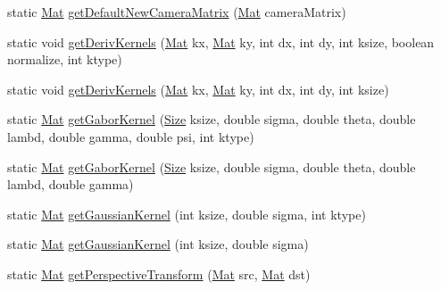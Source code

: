 \begin{DoxyCompactItemize}
static \mbox{\hyperlink{classorg_1_1opencv_1_1core_1_1_mat}{Mat}} \mbox{\hyperlink{classorg_1_1opencv_1_1imgproc_1_1_imgproc_a7299c13c7cc005dcd769dbf58c349b82}{get\+Default\+New\+Camera\+Matrix}} (\mbox{\hyperlink{classorg_1_1opencv_1_1core_1_1_mat}{Mat}} camera\+Matrix)
\item 
static void \mbox{\hyperlink{classorg_1_1opencv_1_1imgproc_1_1_imgproc_aad7100f31c477bc17ad6c868f16822f2}{get\+Deriv\+Kernels}} (\mbox{\hyperlink{classorg_1_1opencv_1_1core_1_1_mat}{Mat}} kx, \mbox{\hyperlink{classorg_1_1opencv_1_1core_1_1_mat}{Mat}} ky, int dx, int dy, int ksize, boolean normalize, int ktype)
\item 
static void \mbox{\hyperlink{classorg_1_1opencv_1_1imgproc_1_1_imgproc_aadd8e596cd6747ac2bf7cf2936f09058}{get\+Deriv\+Kernels}} (\mbox{\hyperlink{classorg_1_1opencv_1_1core_1_1_mat}{Mat}} kx, \mbox{\hyperlink{classorg_1_1opencv_1_1core_1_1_mat}{Mat}} ky, int dx, int dy, int ksize)
\item 
static \mbox{\hyperlink{classorg_1_1opencv_1_1core_1_1_mat}{Mat}} \mbox{\hyperlink{classorg_1_1opencv_1_1imgproc_1_1_imgproc_a878eb2f5d4a0fa92115642d5f2cfcc1a}{get\+Gabor\+Kernel}} (\mbox{\hyperlink{classorg_1_1opencv_1_1core_1_1_size}{Size}} ksize, double sigma, double theta, double lambd, double gamma, double psi, int ktype)
\item 
static \mbox{\hyperlink{classorg_1_1opencv_1_1core_1_1_mat}{Mat}} \mbox{\hyperlink{classorg_1_1opencv_1_1imgproc_1_1_imgproc_a6a76e5878eee9211bfca7e7d63802cc1}{get\+Gabor\+Kernel}} (\mbox{\hyperlink{classorg_1_1opencv_1_1core_1_1_size}{Size}} ksize, double sigma, double theta, double lambd, double gamma)
\item 
static \mbox{\hyperlink{classorg_1_1opencv_1_1core_1_1_mat}{Mat}} \mbox{\hyperlink{classorg_1_1opencv_1_1imgproc_1_1_imgproc_a7f775ca4b4dd4c420a16a65ca28cbc58}{get\+Gaussian\+Kernel}} (int ksize, double sigma, int ktype)
\item 
static \mbox{\hyperlink{classorg_1_1opencv_1_1core_1_1_mat}{Mat}} \mbox{\hyperlink{classorg_1_1opencv_1_1imgproc_1_1_imgproc_a60b28f1c495e346912dd0808d267ba3f}{get\+Gaussian\+Kernel}} (int ksize, double sigma)
\item 
static \mbox{\hyperlink{classorg_1_1opencv_1_1core_1_1_mat}{Mat}} \mbox{\hyperlink{classorg_1_1opencv_1_1imgproc_1_1_imgproc_ab3727363e269af640d5254f76e14ddb6}{get\+Perspective\+Transform}} (\mbox{\hyperlink{classorg_1_1opencv_1_1core_1_1_mat}{Mat}} src, \mbox{\hyperlink{classorg_1_1opencv_1_1core_1_1_mat}{Mat}} dst)
\item 

\end{DoxyCompactItemize}

